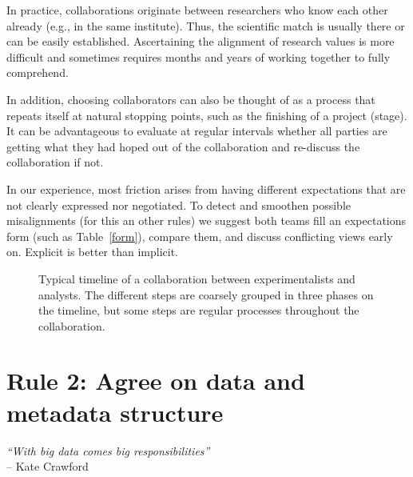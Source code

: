 \documentclass{article}
\begin{document}
In practice, collaborations originate between researchers who know each other already (e.g., in the same institute). Thus, the scientific match is usually there or can be easily established. Ascertaining the alignment of research values is more difficult and sometimes requires months and years of working together to fully comprehend. 

In addition, choosing collaborators can also be thought of as a process that repeats itself at natural stopping points, such as the finishing of a project (stage). It can be advantageous to evaluate at regular intervals whether all parties are getting what they had hoped out of the collaboration and re-discuss the collaboration if not.

In our experience, most friction arises from having different expectations that are not clearly expressed nor negotiated. To detect and smoothen possible misalignments (for this an other rules) we suggest both teams fill an expectations form (such as Table~\ref{form}), compare them, and discuss conflicting views early on. Explicit is better than implicit. 

\begin{figure}[h]
  \centering
  \caption{Typical timeline of a collaboration between experimentalists and analysts. The different steps are coarsely grouped in three phases on the timeline, but some steps are regular processes throughout the collaboration.}
  \label{fig:figure1}
\end{figure}

\section*{Rule 2: Agree on data and metadata structure} %
\label{rule2_data}

\begin{flushright}
\rightskip=1cm\textit{``With big data comes big responsibilities''} \\
\vspace{.2em}
\rightskip=0cm -- Kate Crawford
\end{flushright}
\end{document}
